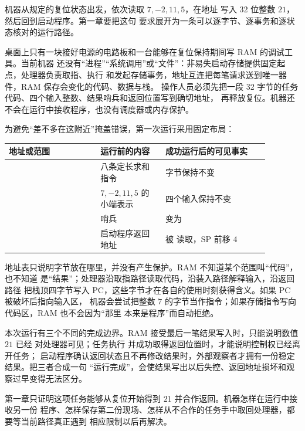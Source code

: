\begin{keyidea}
机器从规定的复位状态出发，依次读取 \(7,-2,11,5\)，在地址
 写入 32 位整数 \(21\)，然后回到启动程序。第一章要把这句
要求展开为一条可以逐字节、逐事务和逐状态核对的运行路径。
\end{keyidea}

桌面上只有一块接好电源的电路板和一台能够在复位保持期间写 RAM 的调试工具。当前机器
还没有“进程”“系统调用”或“文件”：非易失启动存储提供固定起点，处理器负责取指、执行
和发起存储事务，地址互连把每笔请求送到唯一器件，RAM 保存会变化的代码、数据与栈。
操作人员必须先把一段 32 字节的任务代码、四个输入整数、结果哨兵和返回位置写到确切地址，
再释放复位。机器还不会在运行中接收程序，也没有调度器或内存保护。

为避免“差不多在这附近”掩盖错误，第一次运行采用固定布局：

\begin{longtable}{|L{0.31\linewidth}|L{0.22\linewidth}|L{0.35\linewidth}|}
\hline
{}
地址或范围 & 运行前的内容 & 成功运行后的可见事实 \\ \hline
{} & 八条定长求和指令 & 字节保持不变 \\ \hline
{} & \(7,-2,11,5\) 的小端表示 & 四个输入保持不变 \\ \hline
{} & 哨兵  & 变为  \\ \hline
{} & 启动程序返回地址  &
被  读取，SP 前移 4 \\ \hline
\end{longtable}

地址表只说明字节放在哪里，并没有产生保护。RAM 不知道某个范围叫“代码”，也不知道
 是“结果”；处理器沿取指路径读取代码，沿装入路径解释输入，沿返回路径
把栈顶四字节写入 PC，这些字节才在各自的使用时刻获得含义。如果 PC 被破坏后指向输入区，
机器会尝试把整数 \(7\) 的字节当作指令；如果存储指令写向代码区，RAM 也不会因为“那里
本来是程序”而自动拒绝。

本次运行有三个不同的完成边界。RAM 接受最后一笔结果写入时，只能说明数值 \(21\) 已经
对处理器可见；任务执行  并成功取得返回位置时，才能说明控制权已经离开任务；
启动程序确认返回状态且不再修改结果时，外部观察者才拥有一份稳定结果。把三者合成一句
“运行完成”，会使结果写出以后失控、返回地址损坏和观察过早变得无法区分。

第一章只证明这项任务能够从复位开始得到 \(21\) 并合作返回。机器怎样在运行中接收另一份
程序、怎样保存第二份现场、怎样从不合作的任务手中取回处理器，都要等当前路径真正遇到
相应限制以后再解决。
